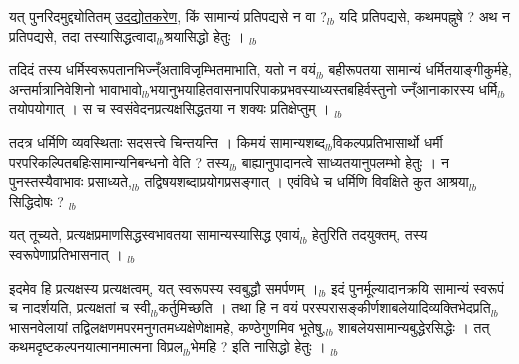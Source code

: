 \documentclass[article,12pt,a4paper]{memoir}%
\newcounter{parCount}
\begin{document}
	  
	  \pstart \leavevmode%
	यत् पुनरिदमुद्द्योतितम् \uline{उदद्योतकरेण}, किं सामान्यं प्रतिपद्यसे न वा ?{\tiny $_{lb}$} यदि प्रतिपद्यसे, कथमपह्नुषे ? अथ न प्रतिपद्यसे, तदा तस्यासिद्धत्वादा{\tiny $_{lb}$}श्रयासिद्धो हेतुः ।
	{}
	\pend%
      {\tiny $_{lb}$}

	  
	  \pstart \leavevmode%
	तदिदं तस्य धर्मिस्वरूपतानभिज्न्ँअताविजृम्भितमाभाति, यतो न वयं{\tiny $_{lb}$} बहीरूपतया सामान्यं धर्मितयाङ्गीकुर्महे, अन्तर्मात्रानिवेशिनो भावाभावो{\tiny $_{lb}$}भयानुभयाहितवासनापरिपाकप्रभवस्याध्यस्तबहिर्वस्तुनो ज्न्ँआनाकारस्य धर्मि{\tiny $_{lb}$}तयोपयोगात् । स च स्वसंवेदनप्रत्यक्षसिद्धतया न शक्यः प्रतिक्षेप्तुम् ।
	{}
	\pend%
      {\tiny $_{lb}$}

	  
	  \pstart \leavevmode%
	तदत्र धर्मिणि व्यवस्थिताः सदसत्त्वे चिन्तयन्ति । किमयं सामान्यशब्द{\tiny $_{lb}$}विकल्पप्रतिभासार्थो धर्मी परपरिकल्पितबहिःसामान्यनिबन्धनो वेति ? तस्य{\tiny $_{lb}$} बाह्यानुपादानत्वे साध्यतयानुपलम्भो हेतुः । न पुनस्तस्यैवाभावः प्रसाध्यते,{\tiny $_{lb}$} तद्विषयशब्दाप्रयोगप्रसङ्गात् । एवंविधे च धर्मिणि विवक्षिते कुत आश्रया{\tiny $_{lb}$}सिद्धिदोषः ?
	{}
	\pend%
      {\tiny $_{lb}$}

	  
	  \pstart \leavevmode%
	यत् तूच्यते, प्रत्यक्षप्रमाणसिद्धस्वभावतया सामान्यस्यासिद्ध एवायं{\tiny $_{lb}$} हेतुरिति तदयुक्तम्, तस्य स्वरूपेणाप्रतिभासनात् ।
	{}
	\pend%
      {\tiny $_{lb}$}

	  
	  \pstart \leavevmode%
	इदमेव हि प्रत्यक्षस्य प्रत्यक्षत्वम्, यत् स्वरूपस्य स्वबुद्धौ समर्पणम् ।{\tiny $_{lb}$} इदं पुनर्मूल्यादानक्रयि सामान्यं स्वरूपं च नादर्शयति, प्रत्यक्षतां च स्वी{\tiny $_{lb}$}कर्तुमिच्छति । तथा हि न वयं परस्परासङ्कीर्णशाबलेयादिव्यक्तिभेदप्रति{\tiny $_{lb}$}भासनवेलायां तद्विलक्षणमपरमनुगतमध्यक्षेणेक्षामहे, कण्ठेगुणमिव भूतेषु,{\tiny $_{lb}$} शाबलेयसामान्यबुद्धेरसिद्धेः । तत् कथमदृष्टकल्पनयात्मानमात्मना विप्रल{\tiny $_{lb}$}भेमहि ? इति नासिद्धो हेतुः ।
	{}
	\pend%
      {\tiny $_{lb}$}
\end{document}
